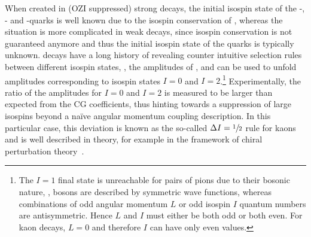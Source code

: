 When created in (OZI suppressed) strong decays, the initial isospin state of the \uquark-, \dquark- and \squark-quarks is well known due to the isospin conservation of \QCD, whereas the situation is more complicated in weak decays, since isospin conservation is not guaranteed anymore and thus the initial isospin state of the quarks is typically unknown.
\decay{\kaon}{\pion\pion} decays have a long history of revealing counter intuitive selection rules between different isospin states, \ie{}, the amplitudes of \decay{\KS}{\piz\piz}, \decay{\KS}{\pip\pim} and \decay{\Kp}{\pip\piz} can be used to unfold amplitudes corresponding to isospin states $I=0$ and $I=2$.\footnote{The $I=1$ final state is unreachable for pairs of pions due to their bosonic nature, \ie{}, bosons are described by symmetric wave functions, whereas combinations of odd angular momentum $L$ or odd isospin $I$ quantum numbers are antisymmetric. Hence $L$ and $I$ must either be both odd or both even. For kaon decays, $L=0$ and therefore $I$ can have only even values.}
Experimentally, the ratio of the amplitudes for $I=0$ and $I=2$ is measured to be larger than expected from the CG coefficients, thus hinting towards a suppression of large isospins beyond a na\"ive angular momentum coupling description.
In this particular case, this deviation is known as the so-called $\Delta I=\sfrac{1}{2}$ rule for kaons and is well described in theory, for example in the framework of chiral perturbation theory~\cite{DeltaIRule}.

